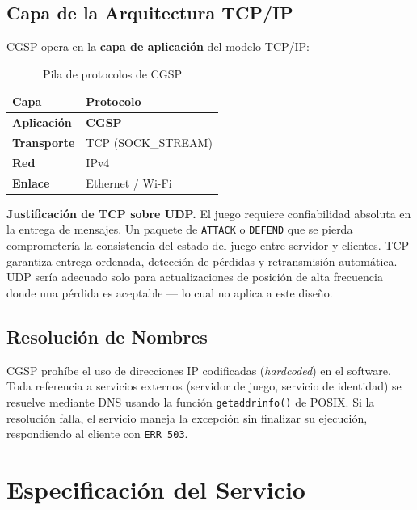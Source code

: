\documentclass[12pt, letterpaper]{article}
\begin{document}
\subsection{Capa de la Arquitectura TCP/IP}

CGSP opera en la \textbf{capa de aplicación} del modelo TCP/IP:

\begin{table}[H]
\centering
\begin{tabular}{>{\bfseries}l l}
\toprule
Capa & Protocolo \\
\midrule
Aplicación  & \textbf{CGSP}\\
Transporte  & TCP (SOCK\_STREAM) \\
Red         & IPv4 \\
Enlace      & Ethernet / Wi-Fi \\
\bottomrule
\end{tabular}
\caption{Pila de protocolos de CGSP}
\end{table}

\begin{nota}
\textbf{Justificación de TCP sobre UDP.} El juego requiere confiabilidad absoluta en
la entrega de mensajes. Un paquete de \texttt{ATTACK} o \texttt{DEFEND} que se
pierda comprometería la consistencia del estado del juego entre servidor y clientes.
TCP garantiza entrega ordenada, detección de pérdidas y retransmisión automática.
UDP sería adecuado solo para actualizaciones de posición de alta frecuencia donde
una pérdida es aceptable --- lo cual no aplica a este diseño.
\end{nota}

\subsection{Resolución de Nombres}

CGSP prohíbe el uso de direcciones IP codificadas (\textit{hardcoded}) en el
software. Toda referencia a servicios externos (servidor de juego, servicio de
identidad) se resuelve mediante DNS usando la función \texttt{getaddrinfo()} de
POSIX. Si la resolución falla, el servicio maneja la excepción sin finalizar su
ejecución, respondiendo al cliente con \texttt{ERR 503}.

\section{Especificación del Servicio}
\end{document}
